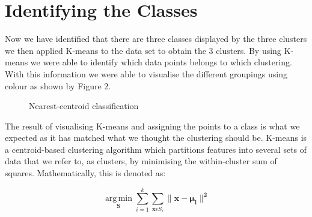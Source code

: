 \documentclass[a4paper, 11pt]{article}
\begin{document}
\section*{\vspace{-0.35cm}Identifying the Classes}
Now we have identified that there are three classes displayed by the three clusters we then applied K-means to the data set to obtain the 3 clusters. By using K-means we were able to identify which data points belongs to which clustering. With this information we were able to visualise the different groupings using colour as shown by Figure 2.

\captionsetup[subfigure]{labelformat=empty}
\begin{figure}[h!]
    \centering
    \qquad
    \caption{Nearest-centroid classification}%
\end{figure}

The result of visualising K-means and assigning the points to a class is what we expected as it has matched what we thought the clustering should be. K-means is a centroid-based clustering algorithm which partitions features into several sets of data that we refer to, as clusters, by minimising the within-cluster sum of squares. Mathematically, this is denoted as: 

\begin{equation*}
  \boldsymbol{\operatorname*{arg\,min}_S} \sum_{i=1}^{k}\sum_{\boldsymbol{x} \epsilon S_i}  \boldsymbol{\parallel x - \mu_{i} \parallel^{2}}
\end{equation*}
\end{document}
